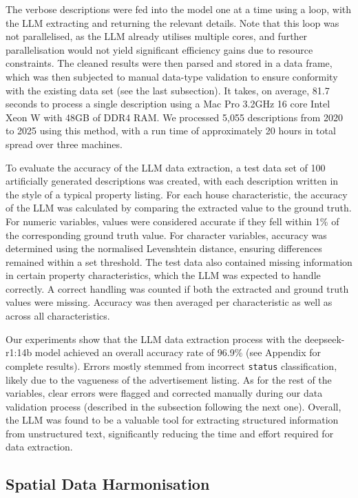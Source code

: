 \documentclass[
  number]{elsarticle}
\begin{document}
The verbose descriptions were fed into the model one at a time using a
loop, with the LLM extracting and returning the relevant details. Note
that this loop was not parallelised, as the LLM already utilises
multiple cores, and further parallelisation would not yield significant
efficiency gains due to resource constraints. The cleaned results were
then parsed and stored in a data frame, which was then subjected to
manual data-type validation to ensure conformity with the existing data
set (see the last subsection). It takes, on average, 81.7 seconds to
process a single description using a Mac Pro 3.2GHz 16 core Intel Xeon W
with 48GB of DDR4 RAM. We processed 5,055 descriptions from 2020 to 2025
using this method, with a run time of approximately 20 hours in total
spread over three machines.

To evaluate the accuracy of the LLM data extraction, a test data set of
100 artificially generated descriptions was created, with each
description written in the style of a typical property listing. For each
house characteristic, the accuracy of the LLM was calculated by
comparing the extracted value to the ground truth. For numeric
variables, values were considered accurate if they fell within 1\% of
the corresponding ground truth value. For character variables, accuracy
was determined using the normalised Levenshtein distance, ensuring
differences remained within a set threshold. The test data also
contained missing information in certain property characteristics, which
the LLM was expected to handle correctly. A correct handling was counted
if both the extracted and ground truth values were missing. Accuracy was
then averaged per characteristic as well as across all characteristics.

Our experiments show that the LLM data extraction process with the
deepseek-r1:14b model achieved an overall accuracy rate of 96.9\% (see
Appendix for complete results). Errors mostly stemmed from incorrect
\texttt{status} classification, likely due to the vagueness of the
advertisement listing. As for the rest of the variables, clear errors
were flagged and corrected manually during our data validation process
(described in the subsection following the next one). Overall, the LLM
was found to be a valuable tool for extracting structured information
from unstructured text, significantly reducing the time and effort
required for data extraction.

\subsection{Spatial Data Harmonisation}\label{sec-spatial-harm}
\end{document}
